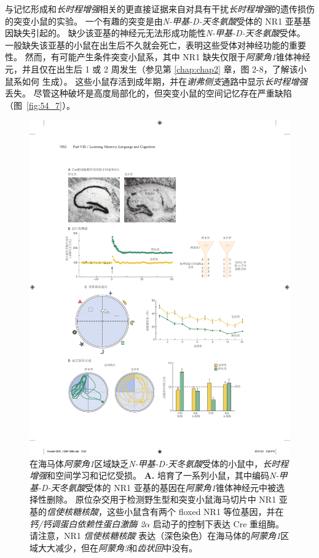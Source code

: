 与记忆形成和\textit{长时程增强}相关的更直接证据来自对具有干扰\textit{长时程增强}的遗传损伤的突变小鼠的实验。
一个有趣的突变是由\textit{N-甲基-D-天冬氨酸}受体的 NR1 亚基基因缺失引起的。
缺少该亚基的神经元无法形成功能性\textit{N-甲基-D-天冬氨酸}受体。
一般缺失该亚基的小鼠在出生后不久就会死亡，表明这些受体对神经功能的重要性。
然而，有可能产生条件突变小鼠系，其中 NR1 缺失仅限于\textit{阿蒙角1}锥体神经元，并且仅在出生后 1 或 2 周发生（参见第 \ref{chap:chap2} 章，图 2-8，了解该小鼠系如何 生成）。
这些小鼠存活到成年期，并在\textit{谢弗侧支}通路中显示\textit{长时程增强}丢失。
尽管这种破坏是高度局部化的，但突变小鼠的空间记忆存在严重缺陷（图~\ref{fig:54_7}）。


\begin{figure}[htbp]
	\centering
	\includegraphics[width=0.8\linewidth]{chap54/fig_54_7}
	\caption{在海马体\textit{阿蒙角1}区域缺乏\textit{N-甲基-D-天冬氨酸}受体的小鼠中，\textit{长时程增强}和空间学习和记忆受损。
		\textbf{A.} 培育了一系列小鼠，其中编码\textit{N-甲基-D-天冬氨酸}受体的 NR1 亚基的基因在\textit{阿蒙角1}锥体神经元中被选择性删除。
		原位杂交用于检测野生型和突变小鼠海马切片中 NR1 亚基的\textit{信使核糖核酸}，这些小鼠含有两个 floxed NR1 等位基因，并在 \textit{钙/钙调蛋白依赖性蛋白激酶 2}$\alpha$ 启动子的控制下表达 Cre 重组酶。
		请注意，NR1 \textit{信使核糖核酸} 表达（深色染色）在海马体的\textit{阿蒙角1}区域大大减少，但在\textit{阿蒙角3}和\textit{齿状回}中没有。
}
\end{figure}
